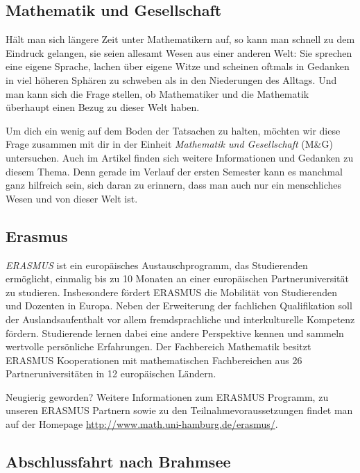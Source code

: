 \subsection*{Mathematik und Gesellschaft}

Hält man sich längere Zeit unter Mathematikern auf, so kann man schnell zu dem
Eindruck gelangen, sie seien allesamt Wesen aus einer anderen Welt: Sie
sprechen eine eigene Sprache, lachen über eigene Witze und scheinen oftmals in
Gedanken in viel höheren Sphären zu schweben als in den Niederungen des
Alltags.  Und man kann sich die Frage stellen, ob Mathematiker und die
Mathematik überhaupt einen Bezug zu dieser Welt haben.


Um dich ein wenig auf dem Boden der Tatsachen zu halten, möchten wir diese
Frage zusammen mit dir in der Einheit \emph{Mathematik und Gesellschaft} (M\&G)
untersuchen. Auch im Artikel  finden sich weitere Informationen und
Gedanken zu diesem Thema. Denn gerade im Verlauf der ersten Semester kann es
manchmal ganz hilfreich sein, sich daran zu erinnern, dass man auch nur ein
menschliches Wesen und von dieser Welt ist.

\subsection{Erasmus}


\emph{ERASMUS} ist ein europäisches Austauschprogramm, das Studierenden
ermöglicht, einmalig bis zu 10 Monaten an einer europäischen Partneruniversität
zu studieren. Insbesondere fördert ERASMUS die Mobilität von Studierenden und
Dozenten in Europa. Neben der Erweiterung der fachlichen Qualifikation soll der
Auslandsaufenthalt vor allem fremdsprachliche und interkulturelle Kompetenz
fördern. Studierende lernen dabei eine andere Perspektive kennen und sammeln
wertvolle persönliche Erfahrungen. Der Fachbereich Mathematik besitzt ERASMUS
Kooperationen mit mathematischen Fachbereichen aus 26 Partneruniversitäten in
12 europäischen Ländern.

Neugierig geworden? Weitere Informationen zum ERASMUS Programm, zu unseren
ERASMUS Partnern sowie zu den Teilnahmevoraussetzungen findet man auf der
Homepage \url{http://www.math.uni-hamburg.de/erasmus/}.

\subsection*{Abschlussfahrt nach Brahmsee}


